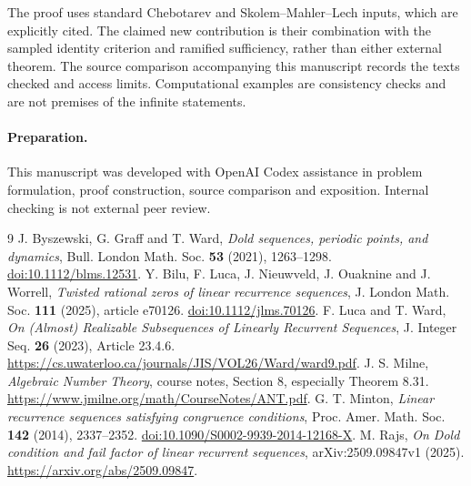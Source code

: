 \documentclass[11pt]{article}
\theoremstyle{definition}
\theoremstyle{remark}
\begin{document}
The proof uses standard Chebotarev and Skolem--Mahler--Lech inputs, which are explicitly cited. The claimed new contribution is their combination with the sampled identity criterion and ramified sufficiency, rather than either external theorem. The source comparison accompanying this manuscript records the texts checked and access limits. Computational examples are consistency checks and are not premises of the infinite statements.

\paragraph{Preparation.} This manuscript was developed with OpenAI Codex assistance in problem formulation, proof construction, source comparison and exposition. Internal checking is not external peer review.

\begin{thebibliography}{9}
 J. Byszewski, G. Graff and T. Ward,
\emph{Dold sequences, periodic points, and dynamics},
Bull. London Math. Soc. \textbf{53} (2021), 1263--1298.
\href{https://doi.org/10.1112/blms.12531}{doi:10.1112/blms.12531}.
 Y. Bilu, F. Luca, J. Nieuwveld, J. Ouaknine and J. Worrell,
\emph{Twisted rational zeros of linear recurrence sequences},
J. London Math. Soc. \textbf{111} (2025), article e70126.
\href{https://doi.org/10.1112/jlms.70126}{doi:10.1112/jlms.70126}.
 F. Luca and T. Ward,
\emph{On (Almost) Realizable Subsequences of Linearly Recurrent Sequences},
J. Integer Seq. \textbf{26} (2023), Article 23.4.6.
\url{https://cs.uwaterloo.ca/journals/JIS/VOL26/Ward/ward9.pdf}.
 J. S. Milne, \emph{Algebraic Number Theory}, course notes, Section 8,
especially Theorem 8.31. \url{https://www.jmilne.org/math/CourseNotes/ANT.pdf}.
 G. T. Minton,
\emph{Linear recurrence sequences satisfying congruence conditions},
Proc. Amer. Math. Soc. \textbf{142} (2014), 2337--2352.
\href{https://doi.org/10.1090/S0002-9939-2014-12168-X}{doi:10.1090/S0002-9939-2014-12168-X}.
 M. Rajs,
\emph{On Dold condition and fail factor of linear recurrent sequences},
arXiv:2509.09847v1 (2025). \url{https://arxiv.org/abs/2509.09847}.
\end{thebibliography}
\end{document}
